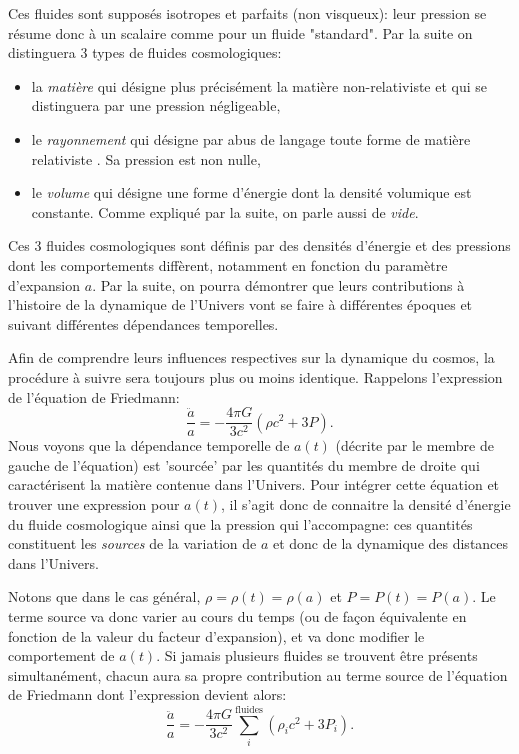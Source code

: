 Ces fluides sont supposés isotropes et parfaits (non visqueux): leur pression se résume donc à un scalaire comme pour un fluide "standard". Par la suite on distinguera 3 types de fluides cosmologiques:
\begin{itemize}
\item la \textit{matière} qui désigne plus précisément la matière non-relativiste et qui se distinguera par une pression négligeable,
\item le \textit{rayonnement} qui désigne par abus de langage toute forme de matière relativiste . Sa pression est non nulle,
\item le \textit{volume} qui désigne une forme d'énergie dont la densité volumique est constante. Comme expliqué par la suite, on parle aussi de \textit{vide}.
\end{itemize}
Ces 3 fluides cosmologiques sont définis par des densités d'énergie et des pressions dont les comportements diffèrent, notamment en fonction du paramètre d'expansion $a$. Par la suite, on pourra démontrer que leurs contributions à l'histoire de la dynamique de l'Univers vont se faire à différentes époques et suivant différentes dépendances temporelles.

Afin de comprendre leurs influences respectives sur la dynamique du cosmos, la procédure à suivre sera toujours plus ou moins identique. Rappelons l'expression de l'équation de Friedmann:
\begin{equation}
\frac{\ddot a}{a}=-\frac{4\pi G}{3c^2}(\rho c^2 +3 P).
\end{equation}
Nous voyons que la dépendance temporelle de $a(t)$ (décrite par le membre de gauche de l'équation) est 'sourcée' par les quantités du membre de droite qui caractérisent la matière contenue dans l'Univers.
Pour intégrer cette équation et trouver une expression pour $a(t)$, il s'agit donc de connaitre la densité d'énergie du fluide cosmologique ainsi que la pression qui l'accompagne: ces quantités constituent les \textit{sources} de la variation de $a$ et donc de la dynamique des distances dans l'Univers. 

Notons que dans le cas général, $\rho=\rho(t)=\rho(a)$ et $P=P(t)=P(a)$. Le terme source va donc varier au cours du temps (ou de façon équivalente en fonction de la valeur du facteur d'expansion), et va donc modifier le comportement de $a(t)$. Si jamais plusieurs fluides se trouvent être présents simultanément, chacun aura sa propre contribution au terme source de l'équation de Friedmann dont l'expression devient alors:
\begin{equation}
\frac{\ddot a}{a}=-\frac{4\pi G}{3c^2}\sum_i^\mathrm{fluides}(\rho_i c^2 +3 P_i).
\end{equation}

